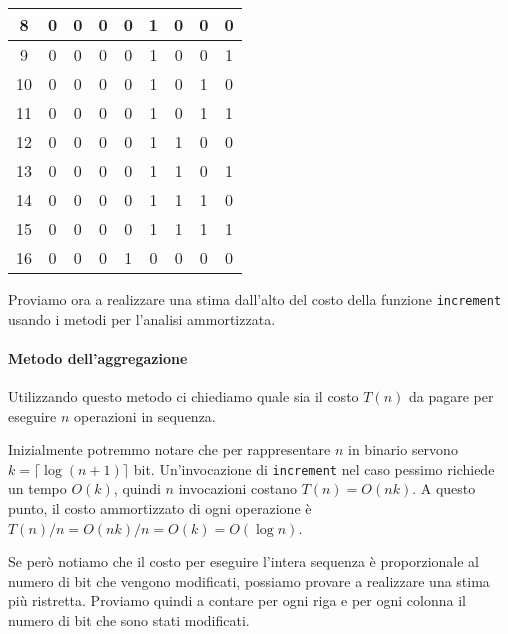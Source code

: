 \begin{eg}
\begin{table}[h!]
\begin{tabular}{|c|c|c|c|c|c|c|c|c|}
        \hline
        8 & 0 & 0 & 0 & 0 & 1 & 0 & 0 & 0\\
        \hline
        9 & 0 & 0 & 0 & 0 & 1 & 0 & 0 & 1\\
        \hline
        10 & 0 & 0 & 0 & 0 & 1 & 0 & 1 & 0\\
        \hline
        11 & 0 & 0 & 0 & 0 & 1 & 0 & 1 & 1\\
        \hline
        12 & 0 & 0 & 0 & 0 & 1 & 1 & 0 & 0\\
        \hline
        13 & 0 & 0 & 0 & 0 & 1 & 1 & 0 & 1\\
        \hline
        14 & 0 & 0 & 0 & 0 & 1 & 1 & 1 & 0\\
        \hline
        15 & 0 & 0 & 0 & 0 & 1 & 1 & 1 & 1\\
        \hline
        16 & 0 & 0 & 0 & 1 & 0 & 0 & 0 & 0\\
        \hline
    \end{tabular}
\end{table}

\bigskip\noindent
Proviamo ora a realizzare una stima dall'alto del costo della funzione
\texttt{increment} usando i metodi per l'analisi ammortizzata.

\paragraph{Metodo dell'aggregazione}
Utilizzando questo metodo ci chiediamo quale sia il costo $T(n)$ da pagare per
eseguire $n$ operazioni in sequenza.

Inizialmente potremmo notare che per rappresentare $n$ in binario servono
$k=\lceil\log(n+1)\rceil$ bit. Un'invocazione di \texttt{increment} nel caso
pessimo richiede un tempo $O(k)$, quindi $n$ invocazioni costano $T(n)=O(nk)$.
A questo punto, il costo ammortizzato di ogni operazione è $T(n)/n=O(nk)/n=O(k)=O(\log n)$.

Se però notiamo che il costo per eseguire l'intera sequenza è proporzionale al
numero di bit che vengono modificati, possiamo provare a realizzare una stima
più ristretta. Proviamo quindi a contare per ogni riga e per ogni colonna il
numero di bit che sono stati modificati.


\end{eg}
